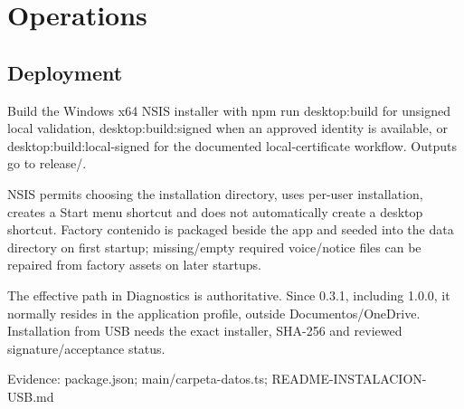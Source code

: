 \section{Operations}
\subsection{Deployment}

Build the Windows x64 NSIS installer with npm run desktop:build for unsigned local validation, desktop:build:signed when an approved identity is available, or desktop:build:local-signed for the documented local-certificate workflow. Outputs go to release/.

NSIS permits choosing the installation directory, uses per-user installation, creates a Start menu shortcut and does not automatically create a desktop shortcut. Factory contenido is packaged beside the app and seeded into the data directory on first startup; missing/empty required voice/notice files can be repaired from factory assets on later startups.

The effective path in Diagnostics is authoritative. Since 0.3.1, including 1.0.0, it normally resides in the application profile, outside Documentos/OneDrive. Installation from USB needs the exact installer, SHA-256 and reviewed signature/acceptance status.

Evidence: package.json; main/carpeta-datos.ts; README-INSTALACION-USB.md

